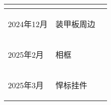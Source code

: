\begin{longtable}{ p{2cm} | p{7.8cm} | p{6cm} |}
\begin{center}
        \end{center} \cellcolor{gndcolor} \\

    \hline
    
        \begin{center}
            2024年12月
        \end{center} &
        \begin{center}
            装甲板周边
        \end{center} &
        \begin{center}
            
        \end{center} \\
        
    \hline
    
        \begin{center}
            2025年2月
        \end{center} &
        \begin{center}
            相框
        \end{center} &
        \begin{center}
            
        \end{center} \\

    \hline
    
        \begin{center}
            2025年3月
        \end{center} &
        \begin{center}
            悍标挂件
        \end{center} &
        \begin{center}
            
        \end{center} \\

    \hline
    
\end{longtable}
